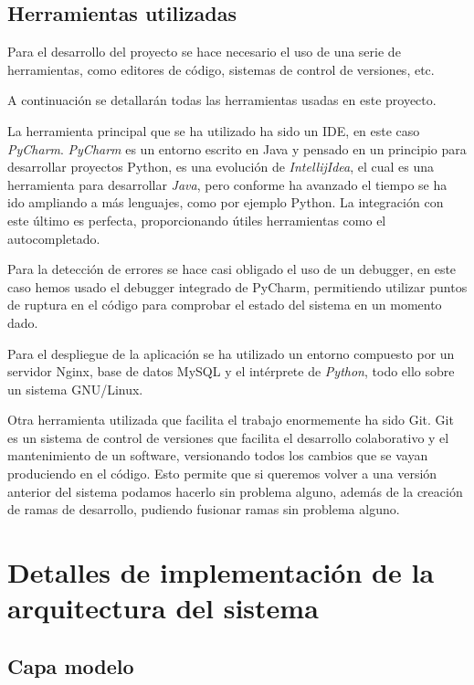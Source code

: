 \documentclass[12pt,a4paperpaper,]{report}
\begin{document}
\subsection{Herramientas utilizadas}\label{herramientas-utilizadas}

Para el desarrollo del proyecto se hace necesario el uso de una serie de
herramientas, como editores de código, sistemas de control de versiones,
etc.

A continuación se detallarán todas las herramientas usadas en este
proyecto.

La herramienta principal que se ha utilizado ha sido un IDE, en este
caso \emph{PyCharm}. \emph{PyCharm} es un entorno escrito en Java y
pensado en un principio para desarrollar proyectos Python, es una
evolución de \emph{IntellijIdea}, el cual es una herramienta para
desarrollar \emph{Java}, pero conforme ha avanzado el tiempo se ha ido
ampliando a más lenguajes, como por ejemplo Python. La integración con
este último es perfecta, proporcionando útiles herramientas como el
autocompletado.

Para la detección de errores se hace casi obligado el uso de un
debugger, en este caso hemos usado el debugger integrado de PyCharm,
permitiendo utilizar puntos de ruptura en el código para comprobar el
estado del sistema en un momento dado.

Para el despliegue de la aplicación se ha utilizado un entorno compuesto
por un servidor Nginx, base de datos MySQL y el intérprete de
\emph{Python}, todo ello sobre un sistema GNU/Linux.

Otra herramienta utilizada que facilita el trabajo enormemente ha sido
Git. Git es un sistema de control de versiones que facilita el
desarrollo colaborativo y el mantenimiento de un software, versionando
todos los cambios que se vayan produciendo en el código. Esto permite
que si queremos volver a una versión anterior del sistema podamos
hacerlo sin problema alguno, además de la creación de ramas de
desarrollo, pudiendo fusionar ramas sin problema alguno.

\section{Detalles de implementación de la arquitectura del
sistema}\label{detalles-de-implementaciuxf3n-de-la-arquitectura-del-sistema}

\subsection{Capa modelo}\label{capa-modelo}
\end{document}
